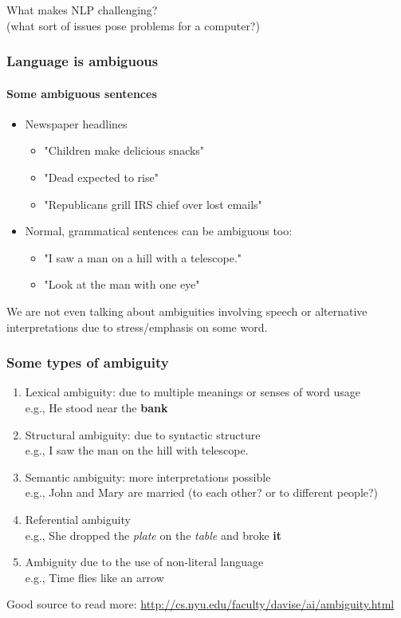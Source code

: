 \documentclass{beamer}
\begin{document}
\begin{frame}
\begin{center}
\Large What makes NLP challenging?
\\ \large (what sort of issues pose problems for a computer?)
\end{center}
\end{frame}

\begin{frame}
\frametitle{Language is ambiguous}
\framesubtitle{Some ambiguous sentences}
\begin{itemize}
\item Newspaper headlines
\begin{itemize}
\item "Children make delicious snacks"
\item "Dead expected to rise"
\item "Republicans grill IRS chief over lost emails"
\end{itemize}
\item Normal, grammatical sentences can be ambiguous too:
\begin{itemize}
\item "I saw a man on a hill with a telescope."
\item "Look at the man with one eye"
\end{itemize}
\end{itemize}
We are not even talking about ambiguities involving speech or alternative interpretations due to stress/emphasis on some word.
\end{frame}

\begin{frame}
\frametitle{Some types of ambiguity}
\begin{enumerate}
\item Lexical ambiguity: due to multiple meanings or senses of word usage
\\ e.g., He stood near the \textbf{bank}
\item Structural ambiguity: due to syntactic structure
\\ e.g., I saw the man on the hill with telescope.
\item Semantic ambiguity: more interpretations possible
\\ e.g., John and Mary are married (to each other? or to different people?)
\item Referential ambiguity
\\ e.g., She dropped the \textit{plate} on the \textit{table} and broke \textbf{it}
\item Ambiguity due to the use of non-literal language
\\ e.g., Time flies like an arrow
\end{enumerate}
Good source to read more: \url{http://cs.nyu.edu/faculty/davise/ai/ambiguity.html}
\end{frame}
\end{document}
